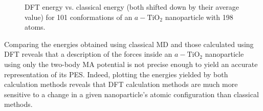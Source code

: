 \documentclass[aps,prb,twocolumn,amsmath,amssymb,superscriptaddress,longbibliography]{revtex4-1}
\newcommand\tab[1][1cm]{\hspace*{#1}} %
\begin{document}
\begin{figure}[htb]
\caption{DFT energy vs. classical energy (both shifted down by their average value) for 101 conformations of an $a-\text{TiO}_2$ nanoparticle with 198 atoms.}
\label{nnp_198}
\end{figure}

\tab Comparing the energies obtained using classical MD and those calculated using DFT reveals that a description of the forces inside an $a-\text{TiO}_2$ nanoparticle using only the two-body MA potential is not precise enough to yield an accurate representation of its PES.
Indeed, plotting the energies yielded by both calculation methods reveals that DFT calculation methods are much more sensitive to a change in a given nanoparticle's atomic configuration than classical methods.
\end{document}
